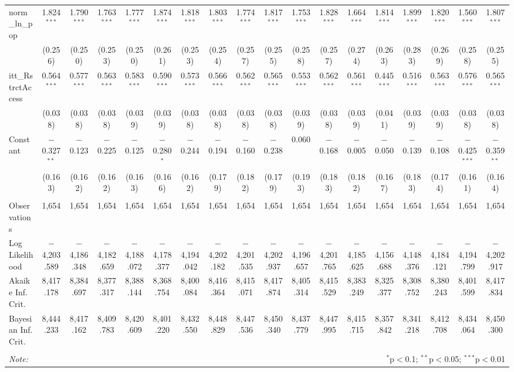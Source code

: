 \begin{sidewaystable}[!htbp]
\begin{tabular}{@{\extracolsep{5pt}}lccccccccccccccccc}
  norm\_ln\_pop & 1.824$^{***}$ & 1.790$^{***}$ & 1.763$^{***}$ & 1.777$^{***}$ & 1.874$^{***}$ & 1.818$^{***}$ & 1.803$^{***}$ & 1.774$^{***}$ & 1.817$^{***}$ & 1.753$^{***}$ & 1.828$^{***}$ & 1.664$^{***}$ & 1.814$^{***}$ & 1.899$^{***}$ & 1.820$^{***}$ & 1.560$^{***}$ & 1.807$^{***}$ \\ 
  & (0.256) & (0.250) & (0.253) & (0.250) & (0.261) & (0.253) & (0.254) & (0.257) & (0.255) & (0.258) & (0.257) & (0.274) & (0.263) & (0.283) & (0.269) & (0.258) & (0.255) \\ 
  itt\_RstrctAccess & 0.564$^{***}$ & 0.577$^{***}$ & 0.563$^{***}$ & 0.583$^{***}$ & 0.590$^{***}$ & 0.573$^{***}$ & 0.566$^{***}$ & 0.562$^{***}$ & 0.565$^{***}$ & 0.553$^{***}$ & 0.562$^{***}$ & 0.561$^{***}$ & 0.445$^{***}$ & 0.516$^{***}$ & 0.563$^{***}$ & 0.576$^{***}$ & 0.565$^{***}$ \\ 
  & (0.038) & (0.038) & (0.038) & (0.039) & (0.039) & (0.038) & (0.038) & (0.038) & (0.038) & (0.039) & (0.038) & (0.039) & (0.041) & (0.039) & (0.039) & (0.038) & (0.038) \\ 
  Constant & $-$0.327$^{**}$ & $-$0.123 & $-$0.225 & $-$0.125 & $-$0.280$^{*}$ & $-$0.244 & $-$0.194 & $-$0.160 & $-$0.238 & 0.060 & $-$0.168 & $-$0.005 & $-$0.050 & $-$0.139 & $-$0.108 & $-$0.425$^{***}$ & $-$0.359$^{**}$ \\ 
  & (0.163) & (0.162) & (0.162) & (0.163) & (0.166) & (0.162) & (0.179) & (0.182) & (0.179) & (0.193) & (0.183) & (0.182) & (0.167) & (0.183) & (0.174) & (0.161) & (0.164) \\ 
 \hline \\[-1.8ex] 
Observations & 1,654 & 1,654 & 1,654 & 1,654 & 1,654 & 1,654 & 1,654 & 1,654 & 1,654 & 1,654 & 1,654 & 1,654 & 1,654 & 1,654 & 1,654 & 1,654 & 1,654 \\ 
Log Likelihood & $-$4,203.589 & $-$4,186.348 & $-$4,182.659 & $-$4,188.072 & $-$4,178.377 & $-$4,194.042 & $-$4,202.182 & $-$4,201.535 & $-$4,202.937 & $-$4,196.657 & $-$4,201.765 & $-$4,185.625 & $-$4,156.688 & $-$4,148.376 & $-$4,184.121 & $-$4,194.799 & $-$4,202.917 \\ 
Akaike Inf. Crit. & 8,417.178 & 8,384.697 & 8,377.317 & 8,388.144 & 8,368.754 & 8,400.084 & 8,416.364 & 8,415.071 & 8,417.874 & 8,405.314 & 8,415.529 & 8,383.249 & 8,325.377 & 8,308.752 & 8,380.243 & 8,401.599 & 8,417.834 \\ 
Bayesian Inf. Crit. & 8,444.233 & 8,417.162 & 8,409.783 & 8,420.609 & 8,401.220 & 8,432.550 & 8,448.829 & 8,447.536 & 8,450.340 & 8,437.779 & 8,447.995 & 8,415.715 & 8,357.842 & 8,341.218 & 8,412.708 & 8,434.064 & 8,450.300 \\ 
\hline 
\hline \\[-1.8ex] 
\textit{Note:}  & \multicolumn{17}{r}{$^{*}$p$<$0.1; $^{**}$p$<$0.05; $^{***}$p$<$0.01} \\ 
\end{tabular} 
\end{sidewaystable} 
